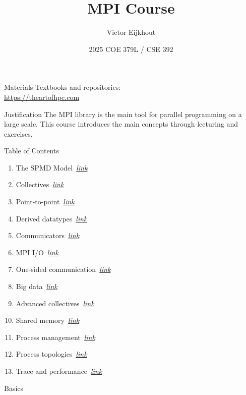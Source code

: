 \documentclass[10pt]{beamer}
\begin{document}
\author[Eijkhout]{Victor Eijkhout}
\date[2025]{2025 COE 379L / CSE 392}
\title[MPI]{MPI Course}
\maketitle

\begin{frame}[containsverbatim]{Materials}
    Textbooks and repositories:\\
    \url{https://theartofhpc.com}
\end{frame}

\begin{frame}{Justification}
  The MPI library is the main tool
  for parallel programming on a large scale.
  This course introduces the main concepts
  through lecturing and exercises.
\end{frame}

\begin{frame}{Table of Contents}
  \begin{enumerate}
  \item The SPMD Model~\hyperlink{sec:spmd}{\textsl{link}}
  \item Collectives~\hyperlink{sec:collectives}{\textsl{link}}
  \item Point-to-point~\hyperlink{sec:ptp}{\textsl{link}}
  \item Derived datatypes~\hyperlink{sec:derived}{\textsl{link}}
  \item Communicators~\hyperlink{sec:comm}{\textsl{link}}
  \item MPI I/O~\hyperlink{sec:io}{\textsl{link}}
  \item One-sided communication~\hyperlink{sec:1side}{\textsl{link}}
  \item Big data~\hyperlink{sec:bigdata}{\textsl{link}}
  \item Advanced collectives~\hyperlink{sec:coll2}{\textsl{link}}
  \item Shared memory~\hyperlink{sec:shared}{\textsl{link}}
  \item Process management~\hyperlink{sec:process}{\textsl{link}}
  \item Process topologies~\hyperlink{sec:topo}{\textsl{link}}
  \item Trace and performance~\hyperlink{sec:trace}{\textsl{link}}
  \end{enumerate}
\end{frame}

\frame{\tableofcontents}
{} {Basics}
\end{document}
